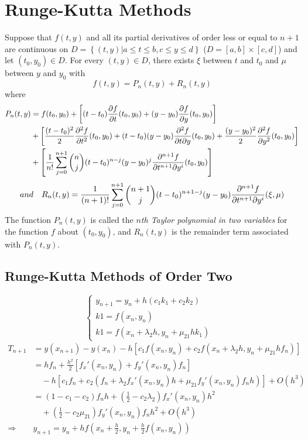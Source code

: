 \section{Runge-Kutta Methods}
\begin{theo}
Suppose that $f(t,y)$ and all its partial derivatives of order less or equal to $n+1$ are continuous on $D=\left\{(t,y)|a\leq t\leq b,c\leq y\leq d\right\}$ ($D=[a,b]\times [c,d]$) and let $(t_0,y_0)\in D$. For every $(t,y)\in D$, there exists $\xi$ between $t$ and $t_0$ and $\mu$ between $y$ and $y_0$ with
\[
f(t,y) = P_n(t,y)+R_n(t,y)
\]
where
\begin{align*}
  P_n(t,y) &= f(t_0,y_0)+\left[(t-t_0)\frac{\partial{}f}{\partial{}t}(t_0,y_0)+(y-y_0)\frac{\partial{}f}{\partial{}y}(t_0,y_0)\right] \\
  &+ \left[\frac{(t-t_0)^2}{2}\frac{\partial{}^2f}{\partial{}t^2}(t_0,y_0)+(t-t_0)(y-y_0)\frac{\partial{}^2f}{\partial{}t\partial y}(t_0,y_0)+\frac{(y-y_0)^2}{2}\frac{\partial{}^2f}{\partial{}y^2}(t_0,y_0)\right] \\
  &+ \left[\frac{1}{n!}\sum_{j=0}^{n+1}\binom{n}{j}(t-t_0)^{n-j}(y-y_0)^j\frac{\partial{}^{n+1}f}{\partial{}t^{n+1}\partial y^i}(t_0,y_0)\right]
\end{align*}
\[
and\quad R_n(t,y)=\frac{1}{(n+1)!}\sum_{j=0}^{n+1}\binom{n+1}{j}(t-t_0)^{n+1-j}(y-y_0)\frac{\partial{}^{n+1}f}{\partial{}t^{n+1}\partial y^i}(\xi,\mu)
\]
The function $P_n(t,y)$ is called the \emph{$n$th Taylor polynomial in two variables} for the function $f$ about $(t_0,y_0)$, and $R_n(t,y)$ is the remainder term associated with $P_n(t,y)$.
\end{theo}
\subsection{Runge-Kutta Methods of Order Two}
\begin{equation*}
  \begin{cases}
    y_{n+1}=y_n+h(c_1k_1+c_2k_2) &\\
    k1 = f(x_n,y_n) &\\
    k1 = f(x_n+\lambda_2h,y_n+\mu_{21}hk_1)
  \end{cases}
\end{equation*}
\begin{align*}
  T_{n+1} &= y(x_{n+1})-y(x_n)-h\left[c_1f(x_n,y_n)+c_2f(x_n+\lambda_2h,y_n+\mu_{21}hf_n)\right] \\
  &= hf_n+\frac{h^2}{2}\left[f_x'(x_n,y_n)+f_y'(x_n,y_n)f_n\right] \\
  &\quad -h\left[c_1f_n+c_2\left(f_n+\lambda_2f_x'(x_n,y_n)h+\mu_{21}f_y'(x_n,y_n)f_nh\right)\right]+O(h^3) \\
  &= (1-c_1-c_2)f_nh+\left(\frac{1}{2}-c_2\lambda_2\right)f_x'(x_n,y_n)h^2 \\
  &\quad +\left(\frac{1}{2}-c_2\mu_{21}\right)f_y'(x_n,y_n)f_nh^2+O(h^3) \\
  \Rightarrow & y_{n+1}=y_n+hf\left(x_n+\frac{h}{2},y_n+\frac{h}{2}f(x_n,y_n)\right)
\end{align*}

